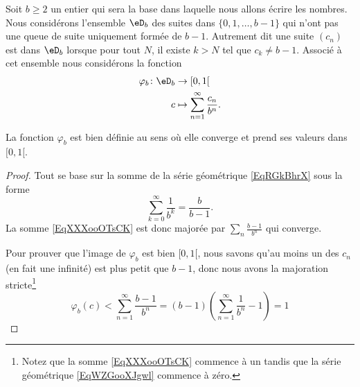 Soit \( b\geq 2\) un entier qui sera la base dans laquelle nous allons écrire les nombres. Nous considérons l'ensemble \( \eD_b\) des suites dans \( \{ 0,1,\ldots, b-1 \}\) qui n'ont pas une queue de suite uniquement formée de \( b-1\). Autrement dit une suite \( (c_n)\) est dans \( \eD_b\) lorsque pour tout \( N\), il existe \( k>N\) tel que \( c_k\neq b-1\). Associé à cet ensemble nous considérons la fonction
\begin{equation}    \label{EqXXXooOTsCK}
    \begin{aligned}
        \varphi_b\colon \eD_b&\to \mathopen[ 0 , 1 [ \\
            c&\mapsto \sum_{n=1}^{\infty}\frac{ c_n }{ b^n }. 
    \end{aligned}
\end{equation}

\begin{lemma}
    La fonction \( \varphi_b\) est bien définie au sens où elle converge et prend ses valeurs dans \( \mathopen[ 0 , 1 [\).
\end{lemma}
    
\begin{proof}
    Tout se base sur la somme de la série géométrique \eqref{EqRGkBhrX} sous la forme
    \begin{equation}    \label{EqWZGooXJgwl}
        \sum_{k=0}^{\infty}\frac{1}{ b^k }=\frac{ b }{ b-1 }.
    \end{equation}
    La somme \eqref{EqXXXooOTsCK} est donc majorée par \( \sum_n\frac{ b-1 }{ b^n }\) qui converge.

    Pour prouver que l'image de \( \varphi_b\) est bien \( \mathopen[ 0 , 1 [\), nous savons qu'au moins un des \( c_n\) (en fait une infinité) est plus petit que \( b-1\), donc nous avons la majoration stricte\footnote{Notez que la somme \eqref{EqXXXooOTsCK} commence à un tandis que la série géométrique \eqref{EqWZGooXJgwl} commence à zéro.}
        \begin{equation}
            \varphi_b(c)<\sum_{n=1}^{\infty}\frac{ b-1 }{ b^n }=(b-1)\left( \sum_{n=1}^{\infty}\frac{1}{ b^n }-1 \right)=1
        \end{equation}
\end{proof}


